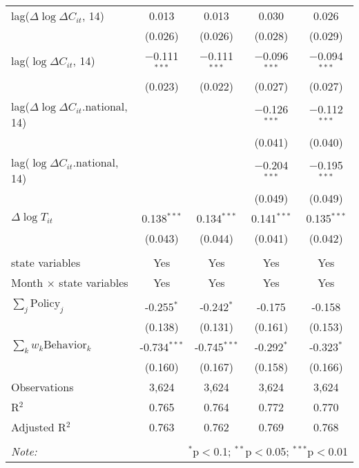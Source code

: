 \begin{tabular}{@{\extracolsep{1pt}}lcccc}
  lag($\Delta \log \Delta C_{it}$, 14) & 0.013 & 0.013 & 0.030 & 0.026 \\ 
  & (0.026) & (0.026) & (0.028) & (0.029) \\ 
  lag($\log \Delta C_{it}$, 14) & $-$0.111$^{***}$ & $-$0.111$^{***}$ & $-$0.096$^{***}$ & $-$0.094$^{***}$ \\ 
  & (0.023) & (0.022) & (0.027) & (0.027) \\ 
  lag($\Delta \log \Delta C_{it}$.national, 14) &  &  & $-$0.126$^{***}$ & $-$0.112$^{***}$ \\ 
  &  &  & (0.041) & (0.040) \\ 
  lag($\log \Delta C_{it}$.national, 14) &  &  & $-$0.204$^{***}$ & $-$0.195$^{***}$ \\ 
  &  &  & (0.049) & (0.049) \\ 
  $\Delta \log T_{it}$ & 0.138$^{***}$ & 0.134$^{***}$ & 0.141$^{***}$ & 0.135$^{***}$ \\ 
  & (0.043) & (0.044) & (0.041) & (0.042) \\ 
 \hline \\[-1.8ex] 
state variables & Yes & Yes & Yes & Yes \\ 
Month $\times$ state variables & Yes & Yes & Yes & Yes \\ 
\hline \\[-1.8ex] 
$\sum_j \mathrm{Policy}_j$ & -0.255$^{*}$ & -0.242$^{*}$ & -0.175 & -0.158 \\ 
 & (0.138) & (0.131) & (0.161) & (0.153) \\ 
$\sum_k w_k \mathrm{Behavior}_k$ & -0.734$^{***}$ & -0.745$^{***}$ & -0.292$^{*}$ & -0.323$^{*}$ \\ 
 & (0.160) & (0.167) & (0.158) & (0.166) \\ 
Observations & 3,624 & 3,624 & 3,624 & 3,624 \\ 
R$^{2}$ & 0.765 & 0.764 & 0.772 & 0.770 \\ 
Adjusted R$^{2}$ & 0.763 & 0.762 & 0.769 & 0.768 \\ 
\hline 
\hline \\[-1.8ex] 
\textit{Note:}  & \multicolumn{4}{r}{$^{*}$p$<$0.1; $^{**}$p$<$0.05; $^{***}$p$<$0.01} \\ 
\end{tabular} 